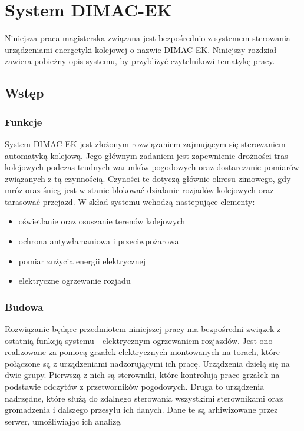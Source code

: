 \chapter{System DIMAC-EK}

Niniejsza praca magisterska związana jest bezpośrednio z systemem sterowania urządzeniami energetyki kolejowej o nazwie DIMAC-EK. Niniejszy rozdział zawiera pobieżny opis systemu, by przybliżyć czytelnikowi tematykę pracy.

\section{Wstęp}

\subsection{Funkcje}

System DIMAC-EK jest złożonym rozwiązaniem zajmującym się sterowaniem automatyką kolejową.\cite{dimacek-katalog} Jego głównym zadaniem jest zapewnienie drożności tras kolejowych podczas trudnych warunków pogodowych oraz dostarczanie pomiarów związanych z tą czynnością. Czyności te dotyczą głównie okresu zimowego, gdy mróz oraz śnieg jest w stanie blokować działanie rozjadów kolejowych oraz tarasować przejazd. W skład systemu wchodzą nastepujące elementy:

\begin{itemize}
\item oświetlanie oraz osuszanie terenów kolejowych
\item ochrona antywłamaniowa i przeciwpożarowa
\item pomiar zużycia energii elektrycznej
\item elektryczne ogrzewanie rozjadu
\end{itemize}

\subsection{Budowa}
Rozwiązanie będące przedmiotem niniejszej pracy ma bezpośredni związek z ostatnią funkcją systemu - elektrycznym ogrzewaniem rozjazdów. Jest ono realizowane za pomocą grzałek elektrycznych montowanych na torach, które połączone są z urządzeniami nadzorującymi ich pracę. Urządzenia dzielą się na dwie grupy. Pierwszą z nich są sterowniki, które kontrolują  prace grzałek na podstawie odczytów z przetworników pogodowych. Druga to urządzenia nadrzędne, które służą do zdalnego sterowania wszystkimi sterownikami oraz gromadzenia i dalszego przesyłu ich danych. Dane te są arhiwizowane przez serwer, umożliwiając ich analizę.

